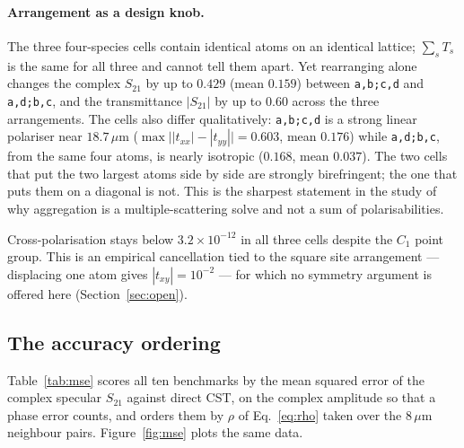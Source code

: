 \documentclass[11pt,a4paper]{article}
\newcommand{\um}{\ensuremath{\,\mu\mathrm{m}}}
\theoremstyle{plain}
\theoremstyle{definition}
\begin{document}
\paragraph{Arrangement as a design knob.} The three four-species cells contain
identical atoms on an identical lattice; $\sum_s T_s$ is the same for all three
and cannot tell them apart. Yet rearranging alone changes the complex $S_{21}$ by
up to $0.429$ (mean $0.159$) between \texttt{a,b;c,d} and \texttt{a,d;b,c}, and
the transmittance $|S_{21}|$ by up to $0.60$ across the three arrangements. The
cells also differ qualitatively: \texttt{a,b;c,d} is a
strong linear polariser near $18.7\um$ ($\max\bigl||t_{xx}| - |t_{yy}|\bigr| =
0.603$, mean $0.176$) while \texttt{a,d;b,c}, from the same four atoms, is nearly
isotropic ($0.168$, mean $0.037$). The two cells that put the two largest atoms
side by side are strongly birefringent; the one that puts them on a diagonal is
not. This is the sharpest statement in the study of why aggregation is a
multiple-scattering solve and not a sum of polarisabilities.

Cross-polarisation stays below $3.2\times10^{-12}$ in all three cells despite the
$C_1$ point group. This is an empirical cancellation tied to the square site
arrangement --- displacing one atom gives $|t_{xy}| = 10^{-2}$ --- for which no
symmetry argument is offered here (Section~\ref{sec:open}).

\subsection{The accuracy ordering}
\label{sec:ordering}

Table~\ref{tab:mse} scores all ten benchmarks by the mean squared error of the
complex specular $S_{21}$ against direct CST, on the complex amplitude so that a
phase error counts, and orders them by $\rho$ of Eq.~\eqref{eq:rho} taken over
the $8\um$ neighbour pairs. Figure~\ref{fig:mse} plots the same data.
\end{document}
